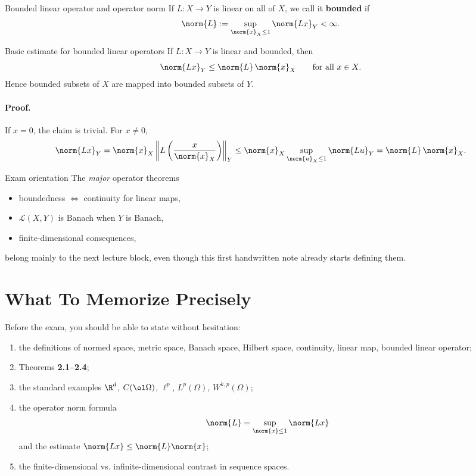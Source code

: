 \documentclass[header={Lecture 1 Exam Study Notes}]{study-note}
\newcommand{\Lp}{L^p}
\begin{document}
\begin{defbox}{Bounded linear operator and operator norm}
If $L:X\to Y$ is linear on all of $X$, we call it \textbf{bounded} if
\[
\norm{L}:=\sup_{\norm{x}_X\le 1}\norm{Lx}_Y<\infty.
\]
\end{defbox}

\begin{thmbox}{Basic estimate for bounded linear operators}
If $L:X\to Y$ is linear and bounded, then
\[
\norm{Lx}_Y\le \norm{L}\,\norm{x}_X
\qquad\text{for all }x\in X.
\]
Hence bounded subsets of $X$ are mapped into bounded subsets of $Y$.
\end{thmbox}

\paragraph{Proof.}
If $x=0$, the claim is trivial. For $x\neq 0$,
\[
\norm{Lx}_Y
=\norm{x}_X\left\|L\left(\frac{x}{\norm{x}_X}\right)\right\|_Y
\le \norm{x}_X \sup_{\norm{u}_X\le 1}\norm{Lu}_Y
=\norm{L}\,\norm{x}_X.
\]

\begin{warningbox}{Exam orientation}
The \emph{major} operator theorems
\begin{itemize}
\item boundedness $\Leftrightarrow$ continuity for linear maps,
\item $\mathcal L(X,Y)$ is Banach when $Y$ is Banach,
\item finite-dimensional consequences,
\end{itemize}
belong mainly to the next lecture block, even though this first handwritten note already starts defining them.
\end{warningbox}

\section{What To Memorize Precisely}

\begin{focusbox}
Before the exam, you should be able to state without hesitation:
\begin{enumerate}
\item the definitions of normed space, metric space, Banach space, Hilbert space, continuity, linear map, bounded linear operator;
\item Theorems \textbf{2.1--2.4};
\item the standard examples $\R^d$, $C(\ol\Omega)$, $\ell^p$, $\Lp(\Omega)$, $W^{k,p}(\Omega)$;
\item the operator norm formula
\[
\norm{L}=\sup_{\norm{x}\le 1}\norm{Lx}
\]
and the estimate $\norm{Lx}\le \norm{L}\norm{x}$;
\item the finite-dimensional vs. infinite-dimensional contrast in sequence spaces.
\end{enumerate}
\end{focusbox}
\end{document}
